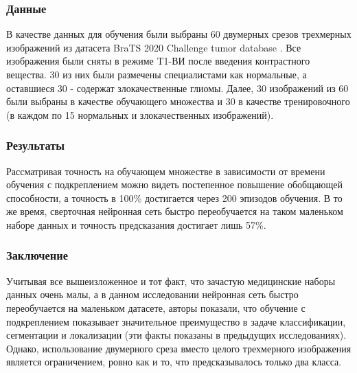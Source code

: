 \subsubsection*{Данные}
В качестве данных для обучения были выбраны 60 двумерных срезов трехмерных изображений из датасета BraTS 2020 Challenge tumor database \cite{BraTS}. 
Все изображения были сняты в режиме T1-ВИ после введения контрастного вещества. 30 из них были размечены специалистами как нормальные,
а оставшиеся 30 - содержат злокачественные глиомы. Далее, 30 изображений из 60 были выбраны в качестве обучающего множества и 
30 в качестве тренировочного (в каждом по 15 нормальных и злокачественных изображений).

\subsubsection*{Результаты}
Рассматривая точность на обучающем множестве в зависимости от времени обучения с подкреплением можно видеть постепенное 
повышение обобщающей способности, а точность в 100\%  достигается через 200 эпизодов обучения. В то же время, 
сверточная нейронная сеть быстро переобучается на таком маленьком наборе данных и точность предсказания достигает лишь 57\%.
\subsubsection*{Заключение}
Учитывая все вышеизложенное и тот факт, что зачастую медицинские наборы данных очень малы, а в данном исследовании 
\grqq\quad нейронная сеть быстро переобучается на маленьком датасете, авторы показали, 
что обучение с подкреплением показывает значительное преимущество в задаче классификации, сегментации 
и локализации (эти факты показаны в предыдущих исследованиях). Однако, использование двумерного среза 
вместо целого трехмерного изображения является ограничением, ровно как и то, что предсказывалось только два класса.
